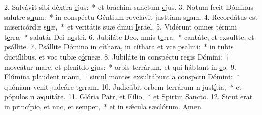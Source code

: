 2. Salvávit sibi déxtra \uline{e}jus:~* et bráchim sanctum \uline{e}jus.
3. Notum fecit Dóminus salutre s\uline{u}um:~* in conspéctu Géntium revelávit justtiam s\uline{u}am.
4. Recordátus est misericórdæ s\uline{u}æ,~* et veritátis suæ dmui \uline{I}sraël.
5. Vidérunt omnes térmni t\uline{e}rræ~* salutár Dei n\uline{o}stri.
6. Jubiláte Deo, mnis t\uline{e}rra:~* cantáte, et exsultte, et ps\uline{á}llite.
7. Psállite Dómino in cíthara, in cíthara et vce ps\uline{a}lmi:~* in tubis ductílibus, et voc tubæ c\uline{ó}rneæ.
8. Jubiláte in conspéctu regis Dómini:~† moveátur mare, et plenitdo \uline{e}jus:~* orbis terrárum, et qui hábtant in \uline{e}o.
9. Flúmina plaudent manu,~† simul montes exsultábunt a conspctu D\uline{ó}mini:~* quóniam venit judcáre t\uline{e}rram.
10. Judicábit orbem terrárum n just\uline{í}tia,~* et pópulos n æquit\uline{á}te.
11. Glória Patr, et F\uline{í}lio,~* et Spirtui S\uline{a}ncto.
12. Sicut erat in princípio, et nnc, et s\uline{e}mper,~* et in sǽcula sæclórum. \uline{A}men.
